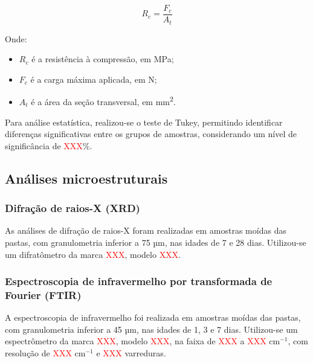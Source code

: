 \begin{equation}
    \label{eq:resistencia_compressao}
    R_c = \frac{F_c}{A_t}
\end{equation}

Onde:
\begin{itemize}
    \item $R_c$ é a resistência à compressão, em MPa;
    \item $F_c$ é a carga máxima aplicada, em N;
    \item $A_t$ é a área da seção transversal, em mm\textsuperscript{2}.
\end{itemize}

Para análise estatística, realizou-se o teste de Tukey, permitindo identificar diferenças significativas entre os grupos de amostras, considerando um nível de significância de \textcolor{red}{XXX}\%.

\subsection{Análises microestruturais}
\label{subsec:analises_microestruturais}

\subsubsection{Difração de raios-X (XRD)}
\label{subsubsec:difracao_de_raios_x}

As análises de difração de raios-X foram realizadas em amostras moídas das pastas, com granulometria inferior a 75 µm, nas idades de 7 e 28 dias. Utilizou-se um difratômetro da marca \textcolor{red}{XXX}, modelo \textcolor{red}{XXX}.

\subsubsection{Espectroscopia de infravermelho por transformada de Fourier (FTIR)}
\label{subsubsec:espectroscopia_de_infravermelho}

A espectroscopia de infravermelho foi realizada em amostras moídas das pastas, com granulometria inferior a 45 µm, nas idades de 1, 3 e 7 dias. Utilizou-se um espectrômetro da marca \textcolor{red}{XXX}, modelo \textcolor{red}{XXX}, na faixa de \textcolor{red}{XXX} a \textcolor{red}{XXX} cm$^{-1}$, com resolução de \textcolor{red}{XXX} cm$^{-1}$ e \textcolor{red}{XXX} varreduras. 

